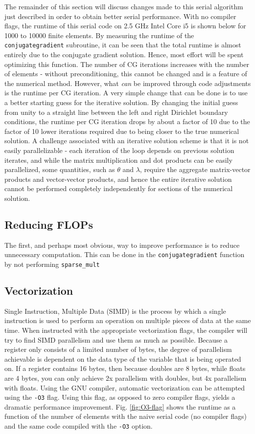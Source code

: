 \documentclass[10pt]{article}
\begin{document}
The remainder of this section will discuss changes made to this serial algorithm just described in order to obtain better serial performance. With no compiler flags, the runtime of this serial code on 2.5 GHz Intel Core i5 is shown below for 1000 to 10000 finite elements. By measuring the runtime of the {\tt conjugategradient} subroutine, it can be seen that the total runtime is almost entirely due to the conjugate gradient solution. Hence, most effort will be spent optimizing this function. The number of CG iterations increases with the number of elements - without preconditioning, this cannot be changed and is a feature of the numerical method. However, what {\it can} be improved through code adjustments is the runtime per CG iteration. A very simple change that can be done is to use a better starting guess for the iterative solution. By changing the initial guess from unity to a straight line between the left and right Dirichlet boundary conditions, the runtime per CG iteration drops by about a factor of 10 due to the factor of 10 lower iterations required due to being closer to the true numerical solution. A challenge associated with an iterative solution scheme is that it is not easily parallelizable - each iteration of the loop depends on previous solution iterates, and while the matrix multiplication and dot products can be easily parallelized, some quantities, such as \(\theta\) and \(\lambda\), require the aggregate matrix-vector products and vector-vector products, and hence the entire iterative solution cannot be performed completely independently for sections of the numerical solution.

\subsection{Reducing FLOPs}
The first, and perhaps most obvious, way to improve performance is to reduce unnecessary computation. This can be done in the {\tt conjugategradient} function by not performing {\tt sparse\_mult} 

\subsection{Vectorization}

Single Instruction, Multiple Data (SIMD) is the process by which a single instruction is used to perform an operation on multiple pieces of data at the same time. When instructed with the appropriate vectorization flags, the compiler will try to find SIMD parallelism and use them as much as possible. Because a register only consists of a limited number of bytes, the degree of parallelism achievable is dependent on the data type of the variable that is being operated on. If a register contains 16 bytes, then because doubles are 8 bytes, while floats are 4 bytes, you can only achieve 2x parallelism with doubles, but 4x parallelism with floats. Using the GNU compiler, automatic vectorization can be attempted using the {\tt -O3} flag. Using this flag, as opposed to zero compiler flags, yields a dramatic performance improvement. Fig. \ref{fig:O3-flag} shows the runtime as a function of the number of elements with the naive serial code (no compiler flags) and the same code compiled with the {\tt -O3} option.
\end{document}
